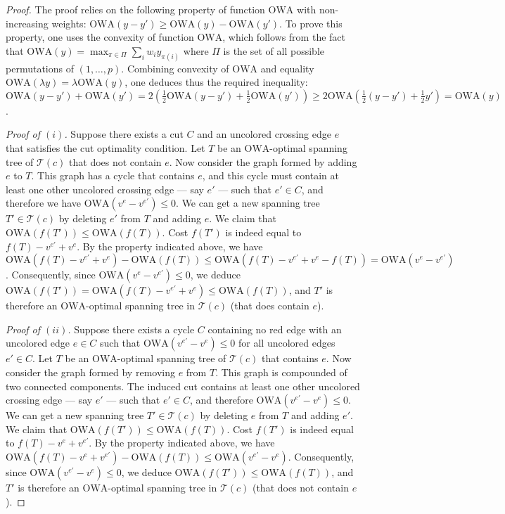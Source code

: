 \documentclass[final,3p,times]{elsarticle}
\newcommand{\owa}{\mbox{OWA}}
\newcommand{\Sol}{\mathcal{T}}
\begin{document}
\begin{proof}
The proof relies on the following property of function $\owa$ with non-increasing weights: $\owa(y-y') \ge \owa(y) - \owa(y')$. To prove this property, one uses the convexity of function $\owa$, which follows from the fact that $\owa(y) = \max_{\pi \in \Pi} \sum_i w_i y_{\pi(i)}$ where $\Pi$ is the set of all possible permutations of $(1,\ldots,p)$.
Combining convexity of $\owa$ and equality $\owa(\lambda y) = \lambda \owa(y)$, one deduces thus the required inequality: $\owa(y-y') + \owa(y') = 2 (\frac{1}{2}\owa(y-y')+\frac{1}{2}\owa(y')) \ge 2 \owa(\frac{1}{2}(y-y')+ \frac{1}{2}y') = \owa(y)$.

\emph{Proof of $(i)$.} Suppose there exists a cut $C$ and an uncolored crossing
edge $e$ that satisfies the cut optimality condition. Let $T$ be an $\owa$-optimal
spanning tree of $\Sol(c)$ that does not contain $e$. Now
consider the graph formed by adding $e$ to $T$. This graph has a cycle
that contains $e$, and this cycle must contain at least one other
uncolored crossing edge --- say $e'$ --- such that $e'\in C$, and
therefore we have $\owa(v^e-v^{e'}) \le 0$. We can get a new spanning tree $T' \in \Sol(c)$ by deleting $e'$ from $T$ and adding $e$. We claim that $\owa(f(T')) \le \owa(f(T))$. Cost $f(T')$ is indeed equal to $f(T) -
v^{e'} + v^e$. By the property indicated above, we have $\owa(f(T)-v^{e'}+v^e) -  \owa(f(T)) \le \owa(f(T)-v^{e'}+v^e - f(T)) = \owa(v^e-v^{e'})$. Consequently, since $\owa(v^e-v^{e'}) \le 0$, we deduce $\owa(f(T')) = \owa(f(T)-v^{e'}+v^e) \le  \owa(f(T))$, and $T'$ is therefore an $\owa$-optimal spanning tree in $\Sol(c)$ (that does contain $e$).

\emph{Proof of $(ii)$.} Suppose there exists a cycle $C$ containing
no red edge with an uncolored edge $e\in C$ such that $\owa(v^{e'}-v^e) \le 0$ for all
uncolored edges $e'\in C$. Let $T$ be an $\owa$-optimal
spanning tree of $\Sol(c)$ that contains $e$. Now consider the graph formed by removing $e$
from $T$. This graph is compounded of two connected components. The
induced cut contains at least one other uncolored crossing edge --- say
$e'$ --- such that $e' \in C$, and therefore $\owa(v^{e'}-v^e) \le 0$. We can get a new
spanning tree $T' \in \Sol(c)$ by deleting $e$ from $T$ and adding $e'$.
We claim that $\owa(f(T')) \le \owa(f(T))$. Cost $f(T')$ is indeed equal to $f(T) - v^e + v^{e'}$. By the property indicated above, we have $\owa(f(T) - v^e + v^{e'}) -  \owa(f(T)) \le \owa(v^{e'} - v^e)$. Consequently, since $\owa(v^{e'} - v^e) \le 0$, we deduce $\owa(f(T')) \le  \owa(f(T))$, and $T'$ is therefore an $\owa$-optimal spanning tree in $\Sol(c)$ (that does not contain $e$).
\end{proof}
\end{document}
